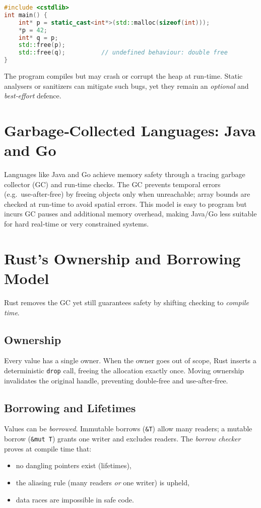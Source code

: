 \documentclass[11pt]{article}
\begin{document}
\begin{lstlisting}[language=C++,caption={Double‑free in C++},label={lst:cpp_df}]
#include <cstdlib>
int main() {
    int* p = static_cast<int*>(std::malloc(sizeof(int)));
    *p = 42;
    int* q = p;
    std::free(p);
    std::free(q);          // undefined behaviour: double free
}
\end{lstlisting}

The program compiles but may crash or corrupt the heap at run‑time.
Static analysers or sanitizers can mitigate such bugs, yet they remain an
\emph{optional} and \emph{best‑effort} defence.

\section{Garbage‑Collected Languages: Java and Go}
Languages like Java and Go achieve memory safety through a tracing garbage
collector (GC) and run‑time checks.
The GC prevents temporal errors (e.g.\ use‑after‑free) by freeing objects only
when unreachable; array bounds are checked at run‑time to avoid spatial errors.
This model is easy to program but incurs GC pauses and additional memory
overhead, making Java/Go less suitable for hard real‑time or very constrained
systems.

\section{Rust’s Ownership and Borrowing Model}
Rust removes the GC yet still guarantees safety by shifting checking to
\emph{compile time}.

\subsection{Ownership}
Every value has a single owner.
When the owner goes out of scope, Rust inserts a deterministic
\texttt{drop} call, freeing the allocation exactly once.
Moving ownership invalidates the original handle, preventing double‑free and
use‑after‑free.

\subsection{Borrowing and Lifetimes}
Values can be \emph{borrowed}.
Immutable borrows (\texttt{\&T}) allow many readers; a mutable borrow
(\texttt{\&mut T}) grants one writer and excludes readers.
The \emph{borrow checker} proves at compile time that:
\begin{itemize}
    \item no dangling pointers exist (lifetimes),
    \item the aliasing rule (many readers \emph{or} one writer) is upheld,
    \item data races are impossible in safe code.
\end{itemize}
\end{document}
